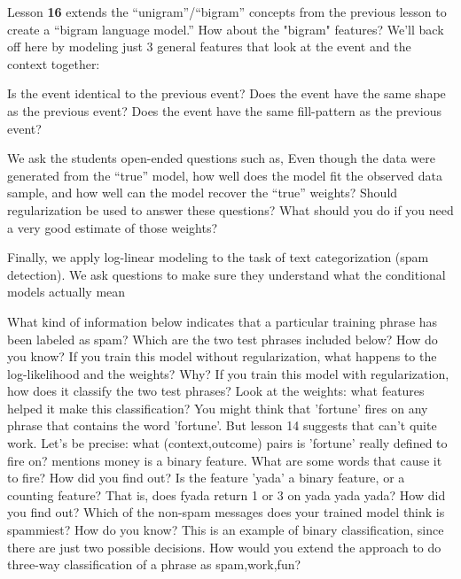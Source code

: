 \documentclass[11pt,letterpaper]{article}
\begin{document}
Lesson \textbf{16} extends the ``unigram''/``bigram'' concepts from the previous lesson to create a ``bigram language model.'' 
How about the "bigram" features? We'll back off here by modeling just 3 general features that look at the event and the context together:

Is the event identical to the previous event?
Does the event have the same shape as the previous event?
Does the event have the same fill-pattern as the previous event?

We ask the students open-ended questions such as,
Even though the data were generated from the ``true'' model, how well does the model fit the observed data sample, and how well can the model recover the ``true'' weights? Should regularization be used to answer these questions? What should you do if you need a very good estimate of those weights?

Finally, we apply log-linear modeling to the task of text categorization (spam detection). We ask questions to make sure they understand what the conditional models actually mean

What kind of information below indicates that a particular training phrase has been labeled as spam?
Which are the two test phrases included below? How do you know?
If you train this model without regularization, what happens to the log-likelihood and the weights? Why?
If you train this model with regularization, how does it classify the two test phrases? Look at the weights: what features helped it make this classification?
You might think that 'fortune' fires on any phrase that contains the word 'fortune'. But lesson 14 suggests that can't quite work. Let's be precise: what (context,outcome) pairs is 'fortune' really defined to fire on?
mentions money is a binary feature. What are some words that cause it to fire? How did you find out?
Is the feature 'yada' a binary feature, or a counting feature? That is, does fyada return 1 or 3 on yada yada yada? How did you find out?
Which of the non-spam messages does your trained model think is spammiest? How do you know?
This is an example of binary classification, since there are just two possible decisions. How would you extend the approach to do three-way classification of a phrase as {spam,work,fun}?
\end{document}
